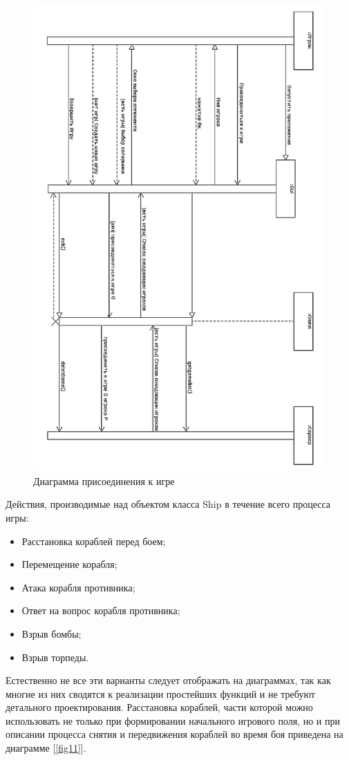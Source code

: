 \begin{figure}[pt]
\centering
\includegraphics[width=15cm]{images/JG.png}
\caption{Диаграмма присоединения к игре}
\label{fig10}
\end{figure}
\newpage
Действия, производимые над объектом класса Ship в течение всего процесса игры:
	\begin{itemize}
		\item Расстановка кораблей перед боем;
		\item Перемещение корабля;
		\item Атака корабля противника;
		\item Ответ на вопрос корабля противника;
		\item Взрыв бомбы;
		\item Взрыв торпеды.
  	\end{itemize} 
Естественно не все эти варианты следует отображать на диаграммах, так как многие из них сводятся к реализации простейших функций и не требуют детального проектирования. 
Расстановка кораблей, части которой можно использовать не только при формировании начального игрового поля, но и при описании процесса снятия и передвижения кораблей во время боя  приведена на диаграмме [\ref{fig11}].


